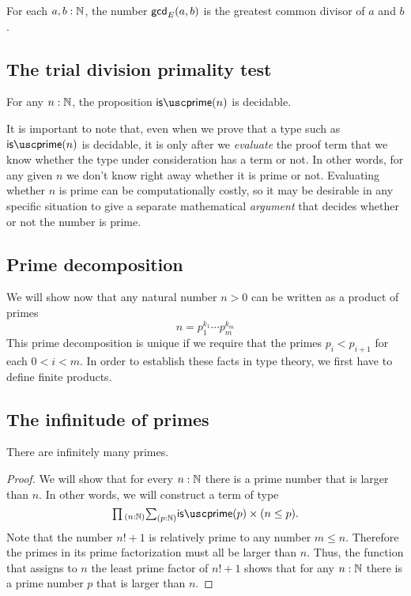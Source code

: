 \begin{prp}
  For each $a,b:{\mathbb{N}}$, the number $\mathsf{gcd}_E(a,b)$ is the greatest common divisor of $a$ and $b$.
\end{prp}


\subsection{The trial division primality test}

\begin{thm}
  For any $n:{\mathbb{N}}$, the proposition $\isprime(n)$ is decidable.
\end{thm}

It is important to note that, even when we prove that a type such as $\isprime(n)$ is decidable, it is only after we \emph{evaluate} the proof term that we know whether the type under consideration has a term or not. In other words, for any given $n$ we don't know right away whether it is prime or not. Evaluating whether $n$ is prime can be computationally costly, so it may be desirable in any specific situation to give a separate mathematical \emph{argument} that decides whether or not the number is prime.

\subsection{Prime decomposition}

We will show now that any natural number $n>0$ can be written as a product of primes
\begin{equation*}
  n=p_1^{k_1}\cdots p_{m}^{k_m}
\end{equation*}
This prime decomposition is unique if we require that the primes $p_i<p_{i+1}$ for each $0<i<m$. In order to establish these facts in type theory, we first have to define finite products.

\subsection{The infinitude of primes}

\begin{thm}
  There are infinitely many primes.
\end{thm}

\begin{proof}
  We will show that for every $n:{\mathbb{N}}$ there is a prime number that is larger than $n$. In other words, we will construct a term of type
  \begin{equation*}
    \prd{n:\N}\sm{p:\N}\isprime(p)\times (n\leq p).
  \end{equation*}
  Note that the number $n!+1$ is relatively prime to any number $m\leq n$. Therefore the primes in its prime factorization must all be larger than $n$. Thus, the function that assigns to $n$ the least prime factor of $n!+1$ shows that for any $n:{\mathbb{N}}$ there is a prime number $p$ that is larger than $n$.
\end{proof}

